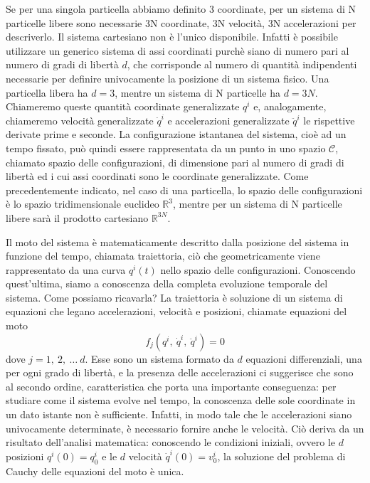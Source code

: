     Se per una singola particella abbiamo definito 3 coordinate, per un sistema di N particelle libere sono necessarie 3N coordinate, 3N velocità, 3N accelerazioni per descriverlo. Il sistema cartesiano non è l'unico disponibile. Infatti è possibile utilizzare un generico sistema di assi coordinati purchè siano di numero pari al numero di gradi di libertà $d$, che corrisponde al numero di quantità indipendenti necessarie per definire univocamente la posizione di un sistema fisico. Una particella libera ha $d = 3$, mentre un sistema di N particelle ha $d = 3N$. Chiameremo queste quantità coordinate generalizzate $q^i$ e, analogamente, chiameremo velocità generalizzate $\dot q^i$ e accelerazioni generalizzate $\ddot q^i$ le rispettive derivate prime e seconde. La configurazione istantanea del sistema, cioè ad un tempo fissato, può quindi essere rappresentata da un punto in uno spazio $\mathcal C$, chiamato spazio delle configurazioni, di dimensione pari al numero di gradi di libertà ed i cui assi coordinati sono le coordinate generalizzate. Come precedentemente indicato, nel caso di una particella, lo spazio delle configurazioni è lo spazio tridimensionale euclideo $\mathbb R^3$, mentre per un sistema di N particelle libere sarà il prodotto cartesiano $\mathbb R^{3N}$.
    
    Il moto del sistema è matematicamente descritto dalla posizione del sistema in funzione del tempo, chiamata traiettoria, ciò che geometricamente viene rappresentato da una curva $q^i(t)$ nello spazio delle configurazioni. Conoscendo quest'ultima, siamo a conoscenza della completa evoluzione temporale del sistema. Come possiamo ricavarla? La traiettoria è soluzione di un sistema di equazioni che legano accelerazioni, velocità e posizioni, chiamate equazioni del moto
    \begin{equation} \label{eqmoto}
        f_j(q^i, ~ \dot q^i, ~ \ddot q^i) = 0
    \end{equation}
    dove $j = 1, ~2, ~\ldots ~d$. Esse sono un sistema formato da $d$ equazioni differenziali, una per ogni grado di libertà, e la presenza delle accelerazioni ci suggerisce che sono al secondo ordine, caratteristica che porta una importante conseguenza: per studiare come il sistema evolve nel tempo, la conoscenza delle sole coordinate in un dato istante non è sufficiente. Infatti, in modo tale che le accelerazioni siano univocamente determinate, è necessario fornire anche le velocità. Ciò deriva da un risultato dell'analisi matematica: conoscendo le condizioni iniziali, ovvero le $d$ posizioni $q^i(0) = q^i_0$ e le $d$ velocità $\dot q^i(0) = v^i_0$, la soluzione del problema di Cauchy delle equazioni del moto è unica. 
    
